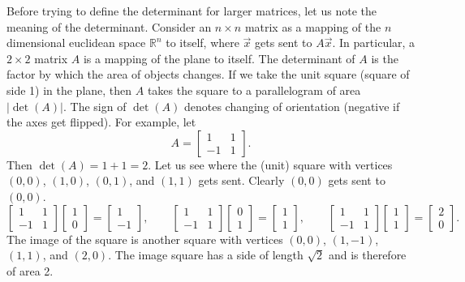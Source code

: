 Before trying to define the
determinant for larger matrices, let us note
the meaning of the determinant.  Consider an $n \times n$ matrix
as a mapping of the $n$ dimensional euclidean space ${\mathbb{R}}^n$ to 
itself, where $\vec{x}$ gets sent to $A \vec{x}$.
In particular, a $2 \times 2$ matrix $A$ is a mapping of
the plane to itself.  The
determinant of 
$A$ is the factor by which the area of objects changes. 
If we take the unit square (square of side 1) in the plane, then
$A$ takes the square to a parallelogram of area $\lvert\det(A)\rvert$.  The sign
of $\det(A)$ denotes changing of orientation (negative if the axes get flipped).  For
example, let
\begin{equation*}
A =
\begin{bmatrix}
1 & 1 \\
-1 & 1
\end{bmatrix} .
\end{equation*}
Then $\det(A) = 1+1 = 2$.  Let us see where the (unit) square with vertices
$(0,0)$, $(1,0)$, $(0,1)$, and $(1,1)$ gets sent.  Clearly $(0,0)$ gets sent
to $(0,0)$.  
\begin{equation*}
\begin{bmatrix}
1 & 1 \\
-1 & 1
\end{bmatrix}
\begin{bmatrix}
1 \\ 0
\end{bmatrix} =
\begin{bmatrix}
1 \\
-1 
\end{bmatrix}
,
\qquad
\begin{bmatrix}
1 & 1 \\
-1 & 1
\end{bmatrix}
\begin{bmatrix}
0 \\ 1
\end{bmatrix} =
\begin{bmatrix}
1 \\
1 
\end{bmatrix}
,
\qquad
\begin{bmatrix}
1 & 1 \\
-1 & 1
\end{bmatrix}
\begin{bmatrix}
1 \\ 1
\end{bmatrix} =
\begin{bmatrix}
2 \\
0 
\end{bmatrix}
.
\end{equation*}
The image of the square is another square with vertices $(0,0)$, $(1,-1)$,
$(1,1)$, and $(2,0)$.  The
image square has
a side of length $\sqrt{2}$ and is therefore of area 2.

